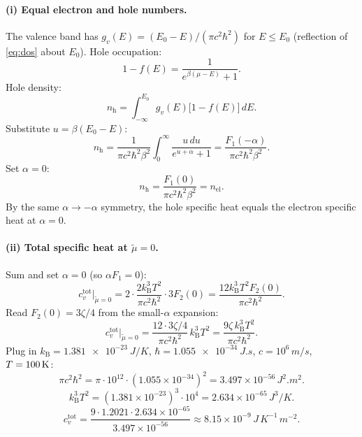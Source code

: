 \documentclass[11pt]{article}
\begin{document}
\paragraph{(i) Equal electron and hole numbers.} The valence band has $g_v(E)=(E_0-E)/(\pi c^2\hbar^2)$ for $E\le E_0$ (reflection of \eqref{eq:dos} about $E_0$). Hole occupation:
\begin{equation}
1-f(E)=\frac{1}{e^{\beta(\mu-E)}+1}.
\end{equation}
Hole density:
\begin{equation}
n_{\mathrm{h}}=\int_{-\infty}^{E_{0}}g_{v}(E)\bigl[1-f(E)\bigr]\,dE.
\end{equation}
Substitute $u=\beta(E_0-E)$:
\begin{equation}
n_{\mathrm{h}}=\frac{1}{\pi c^{2}\hbar^{2}\beta^{2}}\int_{0}^{\infty}\frac{u\,du}{e^{u+\alpha}+1}=\frac{F_{1}(-\alpha)}{\pi c^{2}\hbar^{2}\beta^{2}}.
\label{eq:nh}
\end{equation}
Set $\alpha=0$:
\begin{equation}
n_{\mathrm h}=\frac{F_1(0)}{\pi c^2\hbar^2\beta^2}=n_{\mathrm{el}}.
\end{equation}
By the same $\alpha\to-\alpha$ symmetry, the hole specific heat equals the electron specific heat at $\alpha=0$.

\paragraph{(ii) Total specific heat at $\tilde\mu=0$.} Sum and set $\alpha=0$ (so $\alpha F_1=0$):
\begin{equation}
c_{v}^{\mathrm{tot}}\bigr|_{\tilde\mu=0}=2\cdot\frac{2k_{\mathrm B}^{3}T^{2}}{\pi c^{2}\hbar^{2}}\cdot 3F_{2}(0)=\frac{12k_{\mathrm B}^{3}T^{2}F_2(0)}{\pi c^{2}\hbar^{2}}.
\label{eq:cvtot}
\end{equation}
Read $F_2(0)=3\zeta/4$ from the small-$\alpha$ expansion:
\begin{equation}
\boxed{\,c_{v}^{\mathrm{tot}}\bigr|_{\tilde\mu=0}=\frac{12\cdot 3\zeta/4}{\pi c^{2}\hbar^{2}}\,k_{\mathrm B}^{3}T^{2}=\frac{9\zeta\,k_{\mathrm B}^{3}T^{2}}{\pi c^{2}\hbar^{2}}.\,}
\label{eq:cvtot-final}
\end{equation}
Plug in $k_{\mathrm B}=\SI{1.381e-23}{J/K}$, $\hbar=\SI{1.055e-34}{J.s}$, $c=10^6\,\si{m/s}$, $T=100\,\si K$:
\begin{equation}
\pi c^{2}\hbar^{2}=\pi\cdot 10^{12}\cdot(1.055\times 10^{-34})^{2}=3.497\times 10^{-56}\,\si{J^2.m^2}.
\end{equation}
\begin{equation}
k_{\mathrm B}^{3}T^{2}=(1.381\times 10^{-23})^{3}\cdot 10^{4}=2.634\times 10^{-65}\,\si{J^3/K}.
\end{equation}
\begin{equation}
c_{v}^{\mathrm{tot}}=\frac{9\cdot 1.2021\cdot 2.634\times 10^{-65}}{3.497\times 10^{-56}}\approx 8.15\times 10^{-9}\,\si{J\,K^{-1}\,m^{-2}}.
\end{equation}
\end{document}
